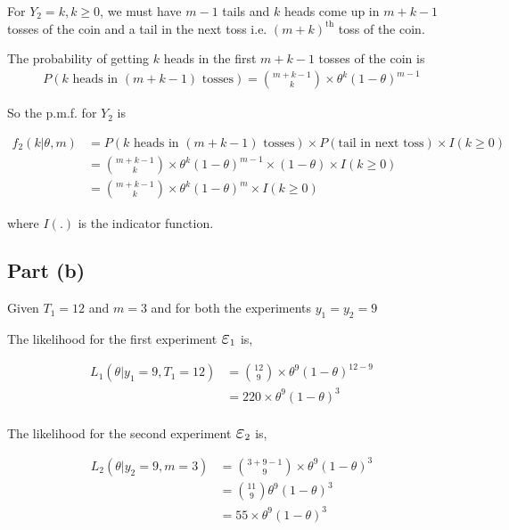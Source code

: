 \documentclass[a4paper]{article}
\begin{document}
For $Y_2 = k, k \geq 0$, we must have $m-1$ tails and $k$ heads come up in $m+k-1$ tosses of the coin and a tail in the next toss i.e. $(m+k)^{\text{th}}$ toss of the coin.

The probability of getting $k$ heads in the first $m+k-1$ tosses of the coin is 
\begin{align*}
    P\left( k \text{ heads in }(m+k-1) \text{ tosses} \right) = \binom{m+k-1}{k} \times \theta^k (1-\theta)^{m-1}
\end{align*}

So the p.m.f. for $Y_2$ is

\begin{align*}
    f_2(k|\theta,m) &= P\left( k \text{ heads in }(m+k-1) \text{ tosses} \right)\times P\left( \text{tail in next toss} \right) \times I(k\geq 0)\\
    &= \binom{m+k-1}{k} \times \theta^k (1-\theta)^{m-1} \times (1-\theta) \times I(k\geq 0)\\
    &= \binom{m+k-1}{k} \times \theta^k (1-\theta)^{m} \times I(k\geq 0)
\end{align*}

where $I(.)$ is the indicator function.


\subsection*{Part (b)}

Given $T_1 = 12$ and $m = 3$ and for both the experiments $y_1 = y_2 = 9$ 

The likelihood for the first experiment $\scalebox{1.5}{\ensuremath{\varepsilon}}_1$ is, 

\begin{align*}
    L_1(\theta|y_1=9,T_1=12) &= \binom{12}{9} \times \theta^9 (1 - \theta)^{12 - 9}\\
    &= 220 \times \theta^9 (1 - \theta)^3\\
\end{align*}

The likelihood for the second experiment $\scalebox{1.5}{\ensuremath{\varepsilon}}_2$ is, 

\begin{align*}
    L_2(\theta|y_2=9,m=3) &= \binom{3+9-1}{9} \times \theta^9 (1-\theta)^{3}\\
    &= \binom{11}{9}\theta^9 (1-\theta)^{3}\\
    &= 55 \times \theta^9 (1-\theta)^{3}
\end{align*}
\end{document}
